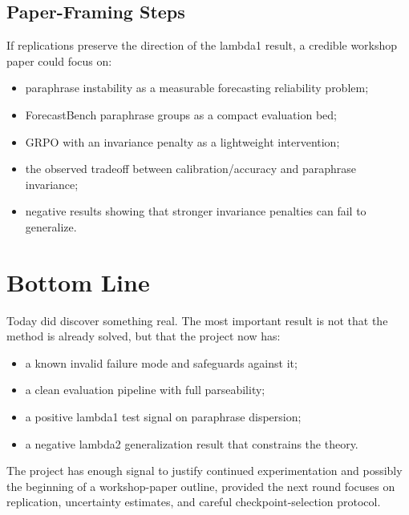 \documentclass[11pt]{article}
\begin{document}
\subsection{Paper-Framing Steps}

If replications preserve the direction of the lambda1 result, a credible
workshop paper could focus on:

\begin{itemize}
  \item paraphrase instability as a measurable forecasting reliability problem;
  \item ForecastBench paraphrase groups as a compact evaluation bed;
  \item GRPO with an invariance penalty as a lightweight intervention;
  \item the observed tradeoff between calibration/accuracy and paraphrase
  invariance;
  \item negative results showing that stronger invariance penalties can fail to
  generalize.
\end{itemize}

\section{Bottom Line}

Today did discover something real. The most important result is not that the
method is already solved, but that the project now has:

\begin{itemize}
  \item a known invalid failure mode and safeguards against it;
  \item a clean evaluation pipeline with full parseability;
  \item a positive lambda1 test signal on paraphrase dispersion;
  \item a negative lambda2 generalization result that constrains the theory.
\end{itemize}

The project has enough signal to justify continued experimentation and possibly
the beginning of a workshop-paper outline, provided the next round focuses on
replication, uncertainty estimates, and careful checkpoint-selection protocol.
\end{document}

